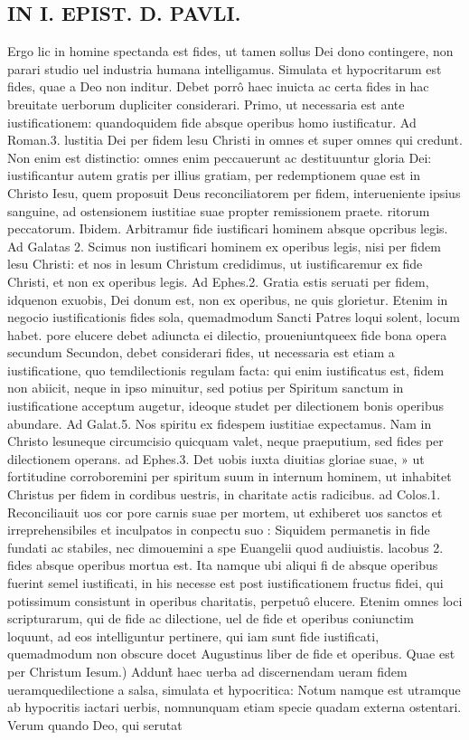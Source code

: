 \documentclass{article}
\begin{document}
\begin{pages}
\section*{IN I. EPIST. D. PAVLI. }
\marginpar{[ p.47 ]}\pstart Ergo lic in homine spectanda est fides, ut tamen sollus Dei dono contingere, non parari studio uel industria humana intelligamus. Simulata et hypocritarum est fides, quae a Deo non inditur. Debet porrô haec inuicta ac certa fides in hac breuitate uerborum dupliciter considerari.  \pend\pstart Primo, ut necessaria est ante iustificationem: quandoquidem fide absque operibus homo iustificatur. Ad Roman.3. lustitia Dei per fidem lesu Christi in omnes et super omnes qui credunt. Non enim est distinctio: omnes enim peccauerunt ac destituuntur gloria Dei: iustificantur autem gratis per illius gratiam, per redemptionem quae est in Christo Iesu, quem proposuit Deus reconciliatorem per fidem, interueniente ipsius sanguine, ad ostensionem iustitiae suae propter remissionem praete.   ritorum peccatorum. Ibidem. Arbitramur fide iustificari hominem absque opcribus legis. Ad Galatas 2. Scimus non iustificari hominem ex operibus legis, nisi per fidem lesu Christi: et nos in lesum Christum credidimus, ut iustificaremur ex fide Christi, et non ex operibus legis. Ad Ephes.2. Gratia estis seruati per fidem, idquenon exuobis, Dei donum est, non ex operibus, ne quis glorietur. Etenim in negocio iustificationis fides sola, quemadmodum Sancti Patres loqui solent, locum habet.  \pend\pstart pore elucere debet adiuncta ei dilectio, proueniuntqueex fide bona opera secundum  Secundon, debet considerari fides, ut necessaria est etiam a iustificatione, quo temdilectionis regulam facta: qui enim iustificatus est, fidem non abiicit, neque in ipso minuitur, sed potius per Spiritum sanctum in iustificatione acceptum augetur, ideoque  studet per dilectionem bonis operibus abundare. Ad Galat.5. Nos spiritu ex fidespem   iustitiae expectamus. Nam in Christo lesuneque  circumcisio quicquam valet, neque  praeputium, sed fides per dilectionem operans. ad Ephes.3. Det uobis iuxta diuitias gloriae suae, » ut fortitudine corroboremini per spiritum suum in internum hominem, ut inhabitet Christus   per fidem in cordibus uestris, in charitate actis radicibus. ad Colos.1. Reconciliauit uos cor   pore carnis suae per mortem, ut exhiberet uos sanctos et irreprehensibiles et inculpatos in conpectu suo : Siquidem permanetis in fide fundati ac stabiles, nec dimouemini a spe Euangelii quod audiuistis. lacobus 2. fides absque  operibus mortua est. Ita namque  ubi aliqui fi de absque  operibus fuerint semel iustificati, in his necesse est post iustificationem fructus fidei, qui potissimum consistunt in operibus charitatis, perpetuô elucere. Etenim omnes loci scripturarum, qui de fide ac dilectione, uel de fide et operibus coniunctim loquunt, ad eos intelliguntur pertinere, qui iam sunt fide iustificati, quemadmodum non obscure docet Augustinus liber  de fide et operibus.  \pend\pstart Quae est per Christum Iesum.) Addunt̃ haec uerba ad discernendam ueram fidem ueramquedilectione a salsa, simulata et hypocritica: Notum namque  est utramque  ab hypocritis iactari uerbis, nomnunquam etiam specie quadam externa ostentari. Verum quando Deo, qui serutat 
\end{pages}
\end{document}
